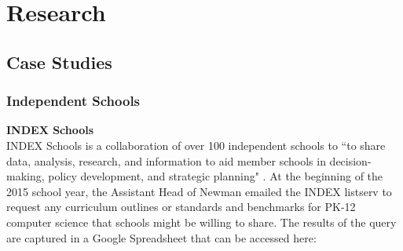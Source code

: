 
\chapter{Research} %

\label{Chapter1} %



\section{Case Studies}
\subsection{Independent Schools}
\textbf{INDEX Schools} \\
INDEX Schools is a collaboration of over 100 independent schools to ``to share data, analysis, research, and information to aid member schools in decision-making, policy development, and strategic planning" \cite{index}. At the beginning of the 2015 school year, the Assistant Head of Newman emailed the INDEX listserv to request any curriculum outlines or standards and benchmarks for PK-12 computer science that schools might be willing to share. The results of the query are captured in a Google Spreadsheet that can be accessed here: \par


